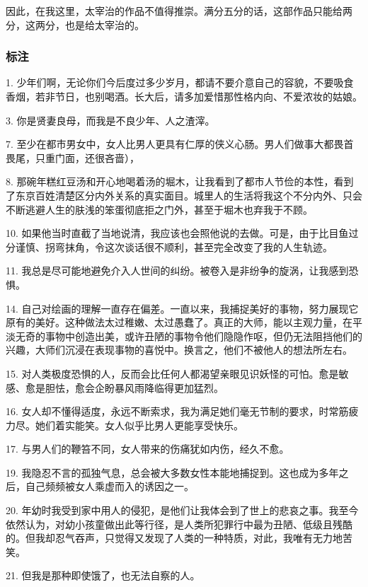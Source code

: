 因此，在我这里，太宰治的作品不值得推崇。满分五分的话，这部作品只能给两分，这两分，也是给太宰治的。
\subsubsection{标注}
1. 少年们啊，无论你们今后度过多少岁月，都请不要介意自己的容貌，不要吸食香烟，若非节日，也别喝酒。长大后，请多加爱惜那性格内向、不爱浓妆的姑娘。

3. 你是贤妻良母，而我是不良少年、人之渣滓。

7. 至少在都市男女中，女人比男人更具有仁厚的侠义心肠。男人们做事大都畏首畏尾，只重门面，还很吝啬），

8. 那碗年糕红豆汤和开心地喝着汤的堀木，让我看到了都市人节俭的本性，看到了东京百姓清楚区分内外关系的真实面目。城里人的生活将我这个不分内外、只会不断逃避人生的肤浅的笨蛋彻底拒之门外，甚至于堀木也弃我于不顾。

10. 如果他当时直截了当地说清，我应该也会照他说的去做。可是，由于比目鱼过分谨慎、拐弯抹角，令这次谈话很不顺利，甚至完全改变了我的人生轨迹。

11. 我总是尽可能地避免介入人世间的纠纷。被卷入是非纷争的旋涡，让我感到恐惧。

14. 自己对绘画的理解一直存在偏差。一直以来，我捕捉美好的事物，努力展现它原有的美好。这种做法太过稚嫩、太过愚蠢了。真正的大师，能以主观力量，在平淡无奇的事物中创造出美，或许丑陋的事物令他们隐隐作呕，但仍无法阻挡他们的兴趣，大师们沉浸在表现事物的喜悦中。换言之，他们不被他人的想法所左右。

15. 对人类极度恐惧的人，反而会比任何人都渴望亲眼见识妖怪的可怕。愈是敏感、愈是胆怯，愈会企盼暴风雨降临得更加猛烈。

16. 女人却不懂得适度，永远不断索求，我为满足她们毫无节制的要求，时常筋疲力尽。她们着实能笑。女人似乎比男人更能享受快乐。

17. 与男人们的鞭笞不同，女人带来的伤痛犹如内伤，经久不愈。

19. 我隐忍不言的孤独气息，总会被大多数女性本能地捕捉到。这也成为多年之后，自己频频被女人乘虚而入的诱因之一。

20. 年幼时我受到家中用人的侵犯，是他们让我体会到了世上的悲哀之事。我至今依然认为，对幼小孩童做出此等行径，是人类所犯罪行中最为丑陋、低级且残酷的。但我却忍气吞声，只觉得又发现了人类的一种特质，对此，我唯有无力地苦笑。

21. 但我是那种即使饿了，也无法自察的人。

